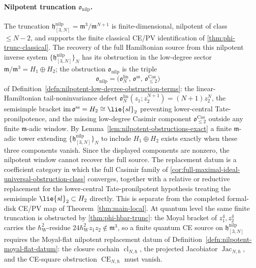 \documentclass[11pt]{memoir}
\begin{document}
\paragraph{\texorpdfstring{Nilpotent truncation \(\mathfrak o_{\mathrm{nilp}}\).}{Nilpotent truncation o-nilp.}}
The truncation
\(\mathfrak h^{\mathrm{nilp}}_{[3,N]}=\mathfrak m^3/\mathfrak m^{N+1}\) is
finite-dimensional, nilpotent of class \(\leq N-2\), and supports the
finite classical CE/PV identification of \ref{thm:phi-trunc-classical}.
The recovery of the full Hamiltonian source from this nilpotent inverse
system
\(\{\mathfrak h^{\mathrm{nilp}}_{[3,N]}\}_N\) has its obstruction in the low-degree sector
\(\mathfrak m/\mathfrak m^3=H_1\oplus H_2\); the obstruction
\(\mathfrak o_{\mathrm{nilp}}\) is the triple
\[
  \mathfrak o_{\mathrm{nilp}}
    =
    \bigl(
      \mathfrak o^{\mathrm{lin}}_N,\,
      \mathfrak o^{\mathrm{ss}},\,
      \mathfrak o^{\mathrm{Cas}}_{\leq2}
    \bigr)
\]
of Definition~\ref{defn:nilpotent-low-degree-obstruction-terms}: the
linear-Hamiltonian tail-noninvariance defect
\(\mathfrak o^{\mathrm{lin}}_N(z_1;z_2^{N+1})=(N+1)z_2^N\), the
semisimple bracket
\(\operatorname{im}\mathfrak o^{\mathrm{ss}}=H_2\cong\lie{sl}_2\)
preventing lower-central Tate-pronilpotence, and the missing
low-degree Casimir component
\(\mathfrak o^{\mathrm{Cas}}_{\leq2}\) outside any finite
\(\mathfrak m\)-adic window.  By
Lemma~\ref{lem:nilpotent-obstructions-exact} a finite
\(\mathfrak m\)-adic tower extending
\(\{\mathfrak h^{\mathrm{nilp}}_{[3,N]}\}_N\) to
include \(H_1\oplus H_2\) exists exactly when these three components
vanish.  Since the displayed components are nonzero, the nilpotent
  window cannot recover the full source.  The replacement datum is a
coefficient category in which the full Casimir family of
\ref{cor:full-maximal-ideal-universal-obstruction-class} converges,
together with a relative or reductive replacement for the
lower-central Tate-pronilpotent hypothesis treating the semisimple
\(\lie{sl}_2\subset H_2\) directly.  This is separate from the
completed formal-disk CE/PV map of Theorem~\ref{thm:main-local}.  At
quantum level the same finite
truncation is obstructed by \ref{thm:phi-hbar-trunc}: the Moyal bracket
of \(z_1^4,z_2^4\) carries the \(\hbar_{\mathrm{W}}^2\)-residue
\(24\hbar_{\mathrm{W}}^2 z_1z_2\notin\mathfrak m^3\), so a finite quantum CE source
on \(\mathfrak h^{\mathrm{nilp}}_{[3,N]}\) requires the Moyal-flat
nilpotent replacement datum of
Definition~\ref{defn:nilpotent-moyal-flat-datum}: the closure cochain
\(\operatorname{cl}_{N,\hbar}\), the projected Jacobiator
\(\operatorname{Jac}_{N,\hbar}\), and the CE-square obstruction
\(\operatorname{CE}_{N,\hbar}\) must vanish.
\end{document}
